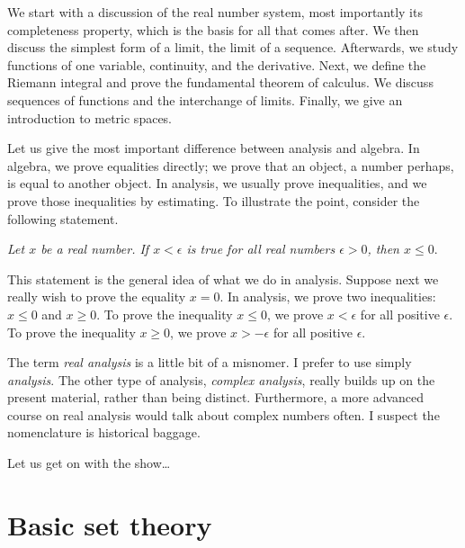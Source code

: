 \medskip

We start with a discussion of the real number system, most importantly
its completeness property, which is the basis for all that comes after.
We then discuss the simplest form of a limit,
the limit of a sequence.  Afterwards, we study
functions of one variable, continuity, and the derivative.
Next, we define the Riemann integral and prove the fundamental theorem of
calculus.  We discuss sequences of functions and the
interchange of limits.  Finally, we give an introduction to metric
spaces.

\medskip

Let us give the most important difference between analysis and algebra.
In algebra, we prove equalities directly;
we prove that an object, a number perhaps, is equal to another object.
In analysis, we usually prove inequalities,
and we prove those inequalities by estimating.
To illustrate the point, consider the following statement.

\medskip

\emph{Let $x$ be a real number.  If $x < \epsilon$ is true for all
real numbers
$\epsilon > 0$, then $x \leq 0$}.

\medskip

This statement is the general idea of what we do in analysis.
Suppose next we really wish to prove the equality
$x = 0$.  In analysis, we prove two inequalities:
$x \leq 0$ and $x \geq 0$.
To
prove the inequality
$x \leq 0$, we prove 
$x < \epsilon$ for all positive $\epsilon$.
To
prove the inequality
$x \geq 0$, we prove 
$x > -\epsilon$ for all positive $\epsilon$.

\medskip

The term \emph{real analysis} is a little bit of a misnomer.  I prefer to
use simply \emph{analysis}.  The other type of analysis, 
\emph{complex analysis}, really builds up on the present material, rather than
being distinct.  Furthermore, a more advanced course on real
analysis would talk about complex numbers often.
I suspect the nomenclature is
historical baggage.

\medskip

Let us get on with the show\ldots



\sectionnewpage
\section{Basic set theory} \label{sec:basicset}

